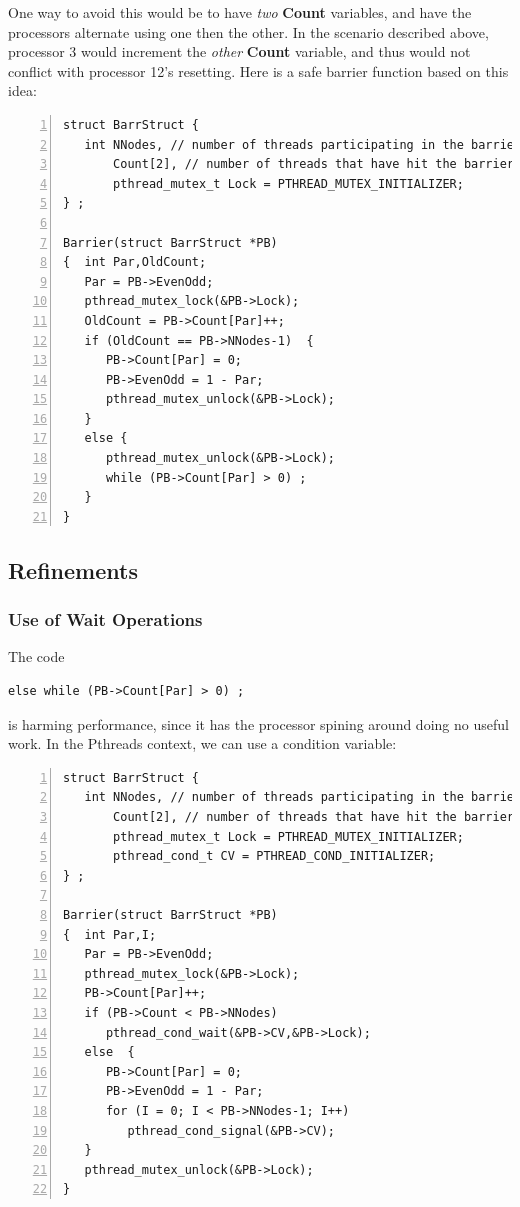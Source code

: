 One way to avoid this would be to have \textit{two} {\bf Count}
variables, and have the processors alternate using one then the other.
In the scenario described above, processor 3 would increment the
\textit{other} {\bf Count} variable, and thus would not conflict with
processor 12's resetting.  Here is a safe barrier function based on this
idea:

\begin{samepage}
\begin{Verbatim}[fontsize=\relsize{-2},numbers=left]
struct BarrStruct {
   int NNodes, // number of threads participating in the barrier
       Count[2], // number of threads that have hit the barrier so far
       pthread_mutex_t Lock = PTHREAD_MUTEX_INITIALIZER;
} ;

Barrier(struct BarrStruct *PB)
{  int Par,OldCount;
   Par = PB->EvenOdd;
   pthread_mutex_lock(&PB->Lock);
   OldCount = PB->Count[Par]++;
   if (OldCount == PB->NNodes-1)  {
      PB->Count[Par] = 0;
      PB->EvenOdd = 1 - Par;
      pthread_mutex_unlock(&PB->Lock);
   }
   else {
      pthread_mutex_unlock(&PB->Lock);
      while (PB->Count[Par] > 0) ;
   }
}
\end{Verbatim}
\end{samepage}

\subsection{Refinements}

\subsubsection{Use of Wait Operations}

The code

\begin{Verbatim}[fontsize=\relsize{-2}]
else while (PB->Count[Par] > 0) ;
\end{Verbatim}

is harming performance, since it has the processor spining around doing
no useful work.  In the Pthreads context, we can use a condition
variable:

\begin{samepage}
\begin{Verbatim}[fontsize=\relsize{-2},numbers=left]
struct BarrStruct {
   int NNodes, // number of threads participating in the barrier
       Count[2], // number of threads that have hit the barrier so far
       pthread_mutex_t Lock = PTHREAD_MUTEX_INITIALIZER;
       pthread_cond_t CV = PTHREAD_COND_INITIALIZER;
} ;

Barrier(struct BarrStruct *PB)
{  int Par,I;
   Par = PB->EvenOdd;
   pthread_mutex_lock(&PB->Lock);
   PB->Count[Par]++;
   if (PB->Count < PB->NNodes)
      pthread_cond_wait(&PB->CV,&PB->Lock);
   else  {
      PB->Count[Par] = 0;
      PB->EvenOdd = 1 - Par;
      for (I = 0; I < PB->NNodes-1; I++)
         pthread_cond_signal(&PB->CV);
   }
   pthread_mutex_unlock(&PB->Lock);
}
\end{Verbatim}
\end{samepage}

